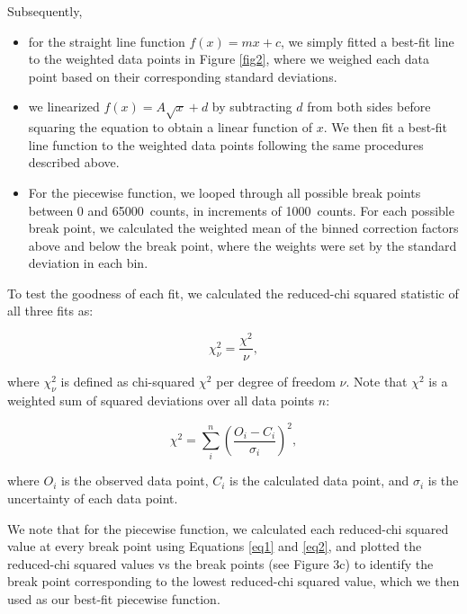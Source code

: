 \documentclass{article}
\newcommand{\rcs}{\chi^2_\nu}
\newcommand{\cs}{\chi^2}
\begin{document}
Subsequently,
\begin{itemize}
    \item for the straight line function $f(x)=mx+c$, we simply fitted a best-fit line to the weighted data points in Figure \ref{fig2}, where we weighed each data point based on their corresponding standard deviations. 
    \item we linearized $f(x)=A\sqrt{x}+d$ by subtracting $d$ from both sides before squaring the equation to obtain a linear function of $x$. We then fit a best-fit line function to the weighted data points following the same procedures described above.
    \item For the piecewise function, we looped through all possible break points between 0 and 65000~counts, in increments of 1000~counts. For each possible break point, we calculated the weighted mean of the binned correction factors above and below the break point, where the weights were set by the standard deviation in each bin.
\end{itemize}

To test the goodness of each fit, we calculated the reduced-chi squared statistic of all three fits as:

\begin{equation}
    \rcs=\frac{\cs}{\nu},
    \label{eq1}
\end{equation}

\noindent where $\rcs$ is defined as chi-squared $\cs$ per degree of freedom $\nu$. Note that $\cs$ is a weighted sum of squared deviations over all data points $n$:

\begin{equation}
    \cs=\sum_i^n(\frac{O_i-C_i}{\sigma_i})^2,
    \label{eq2}
\end{equation}

\noindent where $O_i$ is the observed data point, $C_i$ is the calculated data point, and $\sigma_i$ is the uncertainty of each data point.

We note that for the piecewise function, we calculated each reduced-chi squared value at every break point using Equations \ref{eq1} and \ref{eq2}, and plotted the reduced-chi squared values vs the break points (see Figure 3c) to identify the break point corresponding to the lowest reduced-chi squared value, which we then used as our best-fit piecewise function.
\end{document}
